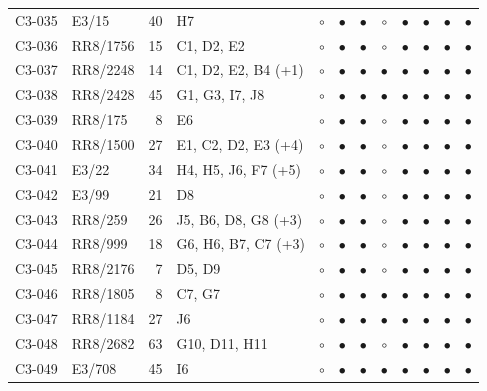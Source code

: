 {\begin{longtable}{llrp{3.9cm}cccccccc}
    C3-035 & E3/15 & 40 & H7 & $\circ$ & $\bullet$ & $\bullet$ & $\circ$ & $\bullet$ & $\bullet$ & $\bullet$ & $\bullet$ \\
    C3-036 & RR8/1756 & 15 & C1, D2, E2 & $\circ$ & $\bullet$ & $\bullet$ & $\circ$ & $\bullet$ & $\bullet$ & $\bullet$ & $\bullet$ \\
    C3-037 & RR8/2248 & 14 & C1, D2, E2, B4 (+1) & $\circ$ & $\bullet$ & $\bullet$ & $\bullet$ & $\bullet$ & $\bullet$ & $\bullet$ & $\bullet$ \\
    C3-038 & RR8/2428 & 45 & G1, G3, I7, J8 & $\circ$ & $\bullet$ & $\bullet$ & $\bullet$ & $\bullet$ & $\bullet$ & $\bullet$ & $\bullet$ \\
    C3-039 & RR8/175 & 8 & E6 & $\circ$ & $\bullet$ & $\bullet$ & $\circ$ & $\bullet$ & $\bullet$ & $\bullet$ & $\bullet$ \\
    C3-040 & RR8/1500 & 27 & E1, C2, D2, E3 (+4) & $\circ$ & $\bullet$ & $\bullet$ & $\circ$ & $\bullet$ & $\bullet$ & $\bullet$ & $\bullet$ \\
    C3-041 & E3/22 & 34 & H4, H5, J6, F7 (+5) & $\circ$ & $\bullet$ & $\bullet$ & $\circ$ & $\bullet$ & $\bullet$ & $\bullet$ & $\bullet$ \\
    C3-042 & E3/99 & 21 & D8 & $\circ$ & $\bullet$ & $\bullet$ & $\circ$ & $\bullet$ & $\bullet$ & $\bullet$ & $\bullet$ \\
    C3-043 & RR8/259 & 26 & J5, B6, D8, G8 (+3) & $\circ$ & $\bullet$ & $\bullet$ & $\circ$ & $\bullet$ & $\bullet$ & $\bullet$ & $\bullet$ \\
    C3-044 & RR8/999 & 18 & G6, H6, B7, C7 (+3) & $\circ$ & $\bullet$ & $\bullet$ & $\circ$ & $\bullet$ & $\bullet$ & $\bullet$ & $\bullet$ \\
    C3-045 & RR8/2176 & 7 & D5, D9 & $\circ$ & $\bullet$ & $\bullet$ & $\circ$ & $\bullet$ & $\bullet$ & $\bullet$ & $\bullet$ \\
    C3-046 & RR8/1805 & 8 & C7, G7 & $\circ$ & $\bullet$ & $\bullet$ & $\bullet$ & $\bullet$ & $\bullet$ & $\bullet$ & $\bullet$ \\
    C3-047 & RR8/1184 & 27 & J6 & $\circ$ & $\bullet$ & $\bullet$ & $\bullet$ & $\bullet$ & $\bullet$ & $\bullet$ & $\bullet$ \\
    C3-048 & RR8/2682 & 63 & G10, D11, H11 & $\circ$ & $\bullet$ & $\bullet$ & $\circ$ & $\bullet$ & $\bullet$ & $\bullet$ & $\bullet$ \\
    C3-049 & E3/708 & 45 & I6 & $\circ$ & $\bullet$ & $\bullet$ & $\bullet$ & $\bullet$ & $\bullet$ & $\bullet$ & $\bullet$ \\

\end{longtable}}
